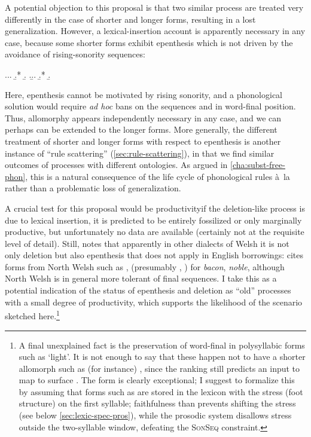 A potential objection to this proposal is that two similar process are treated very differently in the case of shorter and longer forms, resulting in a lost generalization. However, a lexical\hyp insertion account is apparently necessary in any case, because some shorter forms exhibit epenthesis which is  not driven by the avoidance of rising-sonority sequences:

\ex.\a.\a.
\b.*\mbi{[ˈɡuðɡ]}
\b.
\z.\b.\a.
\b.*\mbi{[ˈhelm]}
\b.

Here, epenthesis cannot be motivated by rising sonority, and a phonological solution would require \emph{ad hoc} bans on the sequences \ipa{[ðɡ]} and \ipa{[lm]} in word-final position. Thus, allomorphy appears independently necessary in any case, and we can perhaps can be extended to the longer forms. More generally, the different treatment of shorter and longer forms with respect to epenthesis is another instance of \enquote{rule scattering} (\cref{sec:rule-scattering}), in that we find similar outcomes of processes with different ontologies. As argued in \cref{cha:subst-free-phon}, this is a natural consequence of the life cycle of phonological rules à~la \citet{bermudez-diachr} rather than a problematic loss of generalization.

A crucial test for this proposal would be productivity\dash if the deletion-like process is due to lexical insertion, it is predicted to be entirely fossilized or only marginally productive, but unfortunately no data are available (certainly not at the requisite level of detail). Still, \citet{hannahs09:_welsh} notes that apparently in other dialects of Welsh it is not only deletion but also epenthesis that does not apply in English borrowings: \citet{hannahs09:_welsh} cites forms from North Welsh \citep{fynes-clinton} such as \ipa{[ˈbekn]}, \ipa{[ˈnobl]} (presumably \ipa{[ˈbekn̩]}, ) for \emph{bacon}, \emph{noble}, although North Welsh is in general more tolerant of final sequences. I take this as a potential indication of the status of epenthesis and deletion as \enquote{old} processes with a small degree of productivity, which supports the likelihood of the scenario sketched here.\footnote{A final unexplained fact is the preservation of word-final \ipa{[vn]} in polysyllabic forms such as \ipa{[ˈəskavn]} `light'. It is not enough to say that these happen not to have a shorter allomorph such as (for instance) , since the ranking still predicts an input  to map to surface \ipa{[əsˈkaːvan]}. The form is clearly exceptional; I suggest to formalize this by assuming that forms such as \ipa{[ˈəskavn]} are stored in the lexicon with the stress (\ie foot structure) on the first syllable; faithfulness than prevents shifting the stress (see below \cref{sec:lexic-spec-pros}), while the prosodic system disallows stress outside the two-syllable window, defeating the \textsc{SonSeq} constraint.}

